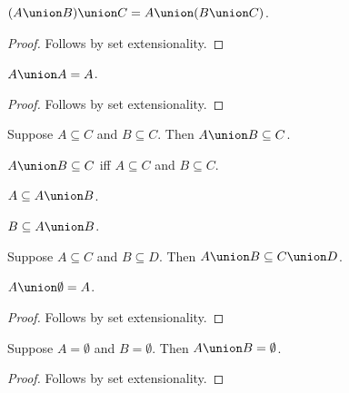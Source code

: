 \begin{proposition}%
\label{union_assoc}
    $(A\union B)\union C = A\union (B\union C)$.
\end{proposition}
\begin{proof}
    Follows by set extensionality.
\end{proof}

\begin{proposition}%
\label{union_idempotent}
    $A\union A = A$.
\end{proposition}
\begin{proof}
    Follows by set extensionality.
\end{proof}

\begin{proposition}\label{union_subsets_is_subset}
    Suppose $A\subseteq C$ and $B\subseteq C$.
    Then $A\union B\subseteq C$.
\end{proposition}

\begin{proposition}\label{subseteq_union_iff}
    $A\union B\subseteq C$ iff $A\subseteq C$ and $B\subseteq C$.
\end{proposition}

\begin{proposition}\label{union_upper_left}
    $A\subseteq A\union B$.
\end{proposition}

\begin{proposition}\label{union_upper_right}
    $B\subseteq A\union B$.
\end{proposition}

\begin{proposition}\label{union_subseteq_union}
    Suppose $A\subseteq C$ and $B\subseteq D$.
    Then $A\union B\subseteq C\union D$.
\end{proposition}

\begin{proposition}%
\label{union_emptyset}
    $A\union\emptyset = A$.
\end{proposition}
\begin{proof}
    Follows by set extensionality.
\end{proof}


\begin{proposition}%
\label{union_emptyset_intro}
    Suppose $A = \emptyset$ and $B = \emptyset$. Then $A\union B = \emptyset$.
\end{proposition}
\begin{proof}
    Follows by set extensionality.
\end{proof}

